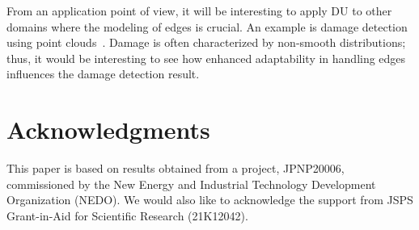 \documentclass[a4paper,fleqn]{cas-dc}
\begin{document}
From an application point of view, it will be interesting to apply DU to other domains where the modeling of edges is crucial. An example is damage detection using point clouds~\cite{xiu2020collapsed}. Damage is often characterized by non-smooth distributions; thus, it would be interesting to see how enhanced adaptability in handling edges influences the damage detection result.      





\section*{Acknowledgments}
This paper is based on results obtained from a project, JPNP20006, commissioned by the New Energy and Industrial Technology Development Organization (NEDO). We would also like to acknowledge the support from JSPS Grant-in-Aid for Scientific Research (21K12042).
\end{document}
